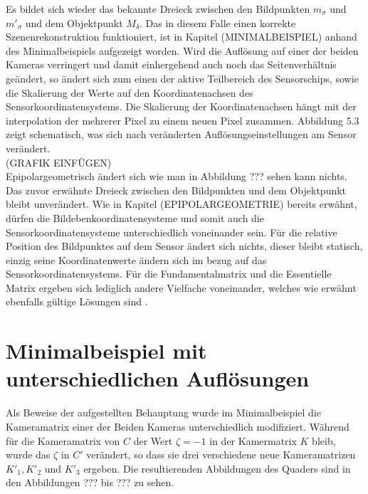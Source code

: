 Es bildet sich wieder das bekannte Dreieck zwischen den Bildpunkten $m_\sigma$ und $m'_{\sigma}$ und dem Objektpunkt $M_\delta$. Das in diesem Falle einen korrekte Szenenrekonstruktion funktioniert, ist in Kapitel (MINIMALBEISPIEL) anhand des Minimalbeispiels aufgezeigt worden. Wird die Auflösung auf einer der beiden Kameras verringert und damit einhergehend auch noch das Seitenverhältnis geändert, so ändert sich zum einen der aktive Teilbereich des Sensorschips, sowie die Skalierung der Werte auf den Koordinatenachsen des Sensorkoordinatensystems. Die Skalierung der Koordinatenachsen hängt mit der interpolation der mehrerer Pixel zu einem neuen Pixel zusammen. Abbildung 5.3 zeigt schematisch, was sich nach veränderten Auflösungseinstellungen am Sensor verändert.\\

(GRAFIK EINFÜGEN)\\


Epipolargeometrisch ändert sich wie man in Abbildung ??? sehen kann nichts. Das zuvor erwähnte Dreieck zwischen den Bildpunkten und dem Objektpunkt bleibt unverändert. Wie in Kapitel (EPIPOLARGEOMETRIE) bereits erwähnt, dürfen die Bildebenkoordinatensysteme und somit auch die Sensorkoordinatensysteme unterschiedlich voneinander sein\cite{Elements}. Für die relative Position des Bildpunktes auf dem Sensor ändert sich nichts, dieser bleibt statisch, einzig seine Koordinatenwerte ändern sich im bezug auf das Sensorkoordinatensystems. Für die Fundamentalmatrix und die Essentielle Matrix ergeben sich lediglich andere Vielfache voneinander, welches wie erwähnt ebenfalls gültige Lösungen sind \cite{HZ,Ferid}.

\section{Minimalbeispiel mit unterschiedlichen Auflösungen}

Als Beweise der aufgestellten Behauptung wurde im Minimalbeispiel die Kameramatrix einer der Beiden Kameras unterschiedlich modifiziert. Während für die Kameramatrix von $C$ der Wert $\zeta = -1$ in der Kamermatrix $K$ bleib, wurde das $\zeta$ in $C'$ verändert, so dass sie drei verschiedene neue Kameramatrizen $K'_1, K'_2$ und $K'_3$ ergeben. Die resultierenden Abbildungen des Quaders sind in den Abbildungen ??? bis ??? zu sehen.



